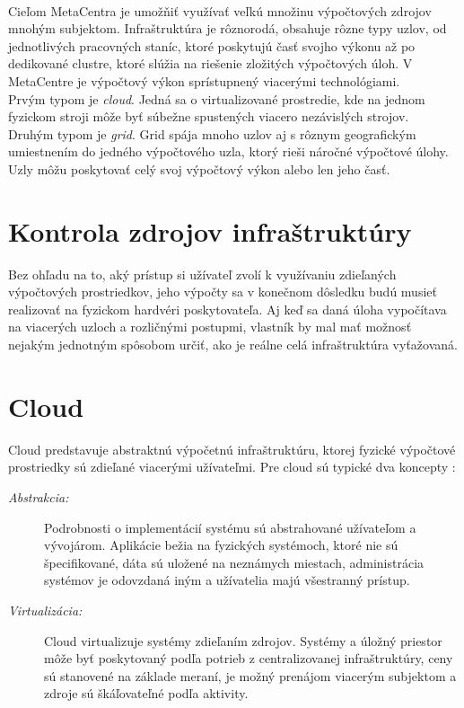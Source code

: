 \documentclass[printed,11pt,twoside,color,cover,table]{fithesis3}
\begin{document}
\\Cieľom MetaCentra je umožňiť využívať veľkú množinu výpočtových zdrojov mnohým subjektom. Infraštruktúra je rôznorodá, obsahuje rôzne typy uzlov, od jednotlivých pracovných staníc, ktoré poskytujú
časť svojho výkonu až po dedikované clustre, ktoré slúžia na riešenie zložitých výpočtových úloh. V MetaCentre je výpočtový výkon sprístupnený viacerými technológiami.
\\Prvým typom je \textit{cloud}. Jedná sa o virtualizované prostredie, kde na jednom fyzickom stroji môže byť súbežne spustených viacero nezávislých strojov.
\\Druhým typom je \textit{grid}. Grid spája mnoho uzlov aj s rôznym geografickým umiestnením do jedného výpočtového uzla, ktorý rieši náročné výpočtové úlohy. Uzly môžu poskytovať celý svoj výpočtový výkon
alebo len jeho časť.

\section{Kontrola zdrojov infraštruktúry}
Bez ohľadu na to, aký prístup si užívateľ zvolí k využívaniu zdieľaných výpočtových prostriedkov, jeho výpočty sa v konečnom dôsledku budú musieť realizovať na fyzickom hardvéri poskytovateľa. 
Aj keď sa daná úloha vypočítava na viacerých uzloch a rozličnými postupmi, vlastník by mal mať možnosť nejakým jednotným spôsobom určiť, ako je reálne celá infraštruktúra vyťažovaná.

\section{Cloud}
Cloud predstavuje abstraktnú výpočetnú infraštruktúru, ktorej fyzické výpočtové prostriedky sú zdieľané viacerými užívateľmi. 
Pre cloud sú typické dva koncepty \cite{cloud_bible}:
\begin{description}
\item[\emph{Abstrakcia:}] Podrobnosti o implementácií systému sú abstrahované užívateľom a vývojárom. Aplikácie bežia na fyzických systémoch,
ktoré nie sú špecifikované, dáta sú uložené na neznámych miestach, administrácia systémov je odovzdaná iným a užívatelia majú
všestranný prístup.
\item[\emph{Virtualizácia:}] Cloud virtualizuje systémy zdieľaním zdrojov. Systémy a úložný priestor môže byť poskytovaný podľa potrieb z 
centralizovanej infraštruktúry, ceny sú stanovené na základe meraní, je možný prenájom viacerým subjektom a zdroje sú škáľovateľné podľa aktivity.
\end{description}
\end{document}
